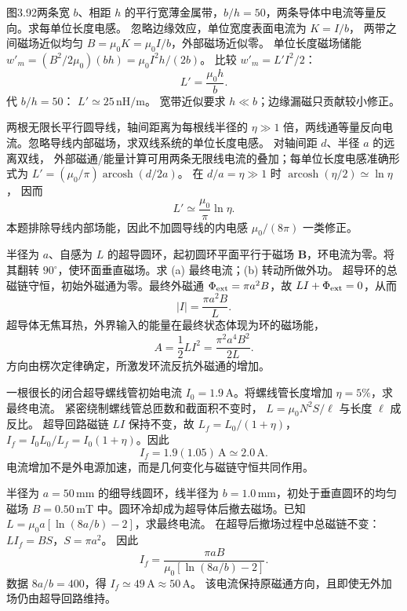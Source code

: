图3.92两条宽 $b$、相距 $h$ 的平行宽薄金属带，$b/h=50$，两条导体中电流等量反向。求每单位长度电感。
\exsolution
忽略边缘效应，单位宽度表面电流为 $K=I/b$，
两带之间磁场近似均匀
$B=\mu_0K=\mu_0I/b$，外部磁场近似零。
单位长度磁场储能
$w'_m=(B^2/2\mu_0)(bh)
=\mu_0I^2h/(2b)$。
比较 $w'_m=L'I^2/2$：
\[
\boxed{L'=\frac{\mu_0h}{b}}.
\]
代 $b/h=50$：
$\boxed{L'\simeq25\,\mathrm{nH/m}}$。
\excheck 宽带近似要求 $h\ll b$；边缘漏磁只贡献较小修正。

两根无限长平行圆导线，轴间距离为每根线半径的 $\eta\gg1$ 倍，两线通等量反向电流。忽略导线内部磁场，求双线系统的单位长度电感。
\exsolution
对轴间距 $d$、半径 $a$ 的远离双线，
外部磁通/能量计算可用两条无限线电流的叠加；每单位长度电感准确形式为
$L'=(\mu_0/\pi)\operatorname{arcosh}(d/2a)$。
在 $d/a=\eta\gg1$ 时
$\operatorname{arcosh}(\eta/2)\simeq\ln\eta$，
因而
\[
\boxed{L'\simeq\frac{\mu_0}{\pi}\ln\eta}.
\]
\excheck 本题排除导线内部场能，因此不加圆导线的内电感 $\mu_0/(8\pi)$ 一类修正。

半径为 $a$、自感为 $L$ 的超导圆环，起初圆环平面平行于磁场 $\bm B$，环电流为零。将其翻转 $90^\circ$，使环面垂直磁场。求 (a) 最终电流；(b) 转动所做外功。
\exsolution
超导环的总磁链守恒，初始外磁通为零。最终外磁通 $\Phi_{\rm ext}=\pi a^2B$，故
$LI+\Phi_{\rm ext}=0$，从而
\[
\boxed{|I|=\frac{\pi a^2B}{L}}.
\]
超导体无焦耳热，外界输入的能量在最终状态体现为环的磁场能，
\[
\boxed{A=\frac12LI^2=\frac{\pi^2a^4B^2}{2L}}.
\]
\excheck 方向由楞次定律确定，所激发环流反抗外磁通的增加。

一根很长的闭合超导螺线管初始电流 $I_0=1.9\,\mathrm A$。将螺线管长度增加 $\eta=5\%$，求最终电流。
\exsolution
紧密绕制螺线管总匝数和截面积不变时，
$L=\mu_0N^2S/\ell$ 与长度 $\ell$ 成反比。
超导回路磁链 $LI$ 保持不变，故
$L_f=L_0/(1+\eta)$，
$I_f=I_0L_0/L_f=I_0(1+\eta)$。因此
\[
\boxed{I_f=1.9(1.05)\,\mathrm A\simeq2.0\,\mathrm A}.
\]
\excheck 电流增加不是外电源加速，而是几何变化与磁链守恒共同作用。

半径为 $a=50\,\mathrm{mm}$ 的细导线圆环，线半径为 $b=1.0\,\mathrm{mm}$，初处于垂直圆环的均匀磁场 $B=0.50\,\mathrm{mT}$ 中。圆环冷却成为超导体后撤去磁场。已知
$L=\mu_0a[\ln(8a/b)-2]$，求最终电流。
\exsolution
在超导后撤场过程中总磁链不变：
$LI_f=BS$，$S=\pi a^2$。
因此
\[
\boxed{I_f=
\frac{\pi aB}{\mu_0[\ln(8a/b)-2]}}.
\]
数据 $8a/b=400$，得
$\boxed{I_f\simeq49\,\mathrm A\approx50\,\mathrm A}$。
\excheck 该电流保持原磁通方向，且即使无外加场仍由超导回路维持。

